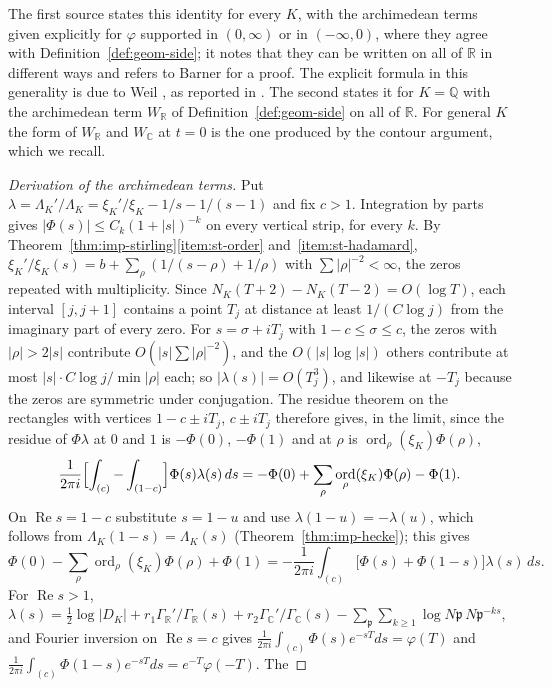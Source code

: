 \documentclass[11pt]{amsart}
\theoremstyle{plain}
\theoremstyle{definition}
\theoremstyle{remark}
\numberwithin{equation}{section}
\newcommand{\C}{\mathbb{C}}
\newcommand{\R}{\mathbb{R}}
\newcommand{\Q}{\mathbb{Q}}
\newcommand{\GR}{\Gamma_{\mathbb{R}}}
\newcommand{\GC}{\Gamma_{\mathbb{C}}}
\DeclareMathOperator{\Rea}{Re}
\DeclareMathOperator{\ord}{ord}
\renewcommand{\Re}{\Rea}
\begin{document}
The first source states this identity for every $K$, with the
archimedean terms given explicitly for $\varphi$ supported in
$(0,\infty)$ or in $(-\infty,0)$, where they agree with
Definition~\ref{def:geom-side}; it notes that they can be written on
all of $\R$ in different ways and refers to Barner
\cite{Barner1981Explicit} for a proof. The explicit formula in this
generality is due to Weil \cite{Weil1952Explicit}, as reported in
\cite[\S V, p.~8]{Bombieri2000Clay}. The
second states it for $K=\Q$ with the archimedean term $W_\R$ of
Definition~\ref{def:geom-side} on all of $\R$. For general $K$ the form
of $W_\R$ and $W_\C$ at $t=0$ is the one produced by the contour
argument, which we recall.

\begin{proof}[Derivation of the archimedean terms]
Put $\lambda=\Lambda_K'/\Lambda_K=\xi_K'/\xi_K-1/s-1/(s-1)$ and fix
$c>1$. Integration by parts gives $|\Phi(s)|\le C_k(1+|s|)^{-k}$ on
every vertical strip, for every $k$. By
Theorem~\ref{thm:imp-stirling}\ref{item:st-order}
and~\ref{item:st-hadamard},
$\xi_K'/\xi_K(s)=b+\sum_\rho(1/(s-\rho)+1/\rho)$ with
$\sum|\rho|^{-2}<\infty$, the zeros repeated with multiplicity. Since
$N_K(T+2)-N_K(T-2)=O(\log T)$, each interval $[j,j+1]$ contains a
point $T_j$ at distance at least $1/(C\log j)$ from the imaginary part
of every zero. For $s=\sigma+iT_j$ with $1-c\le\sigma\le c$, the zeros
with $|\rho|>2|s|$ contribute $O(|s|\sum|\rho|^{-2})$, and the
$O(|s|\log|s|)$ others contribute at most
$|s|\cdot C\log j/\min|\rho|$ each; so $|\lambda(s)|=O(T_j^3)$, and
likewise at $-T_j$ because the zeros are symmetric under conjugation.
The residue theorem on the rectangles with vertices $1-c\pm iT_j$,
$c\pm iT_j$ therefore gives, in the limit, since the residue of
$\Phi\lambda$ at $0$ and $1$ is $-\Phi(0)$, $-\Phi(1)$ and at $\rho$ is
$\ord_\rho(\xi_K)\Phi(\rho)$,
\[
\frac1{2\pi i}\Bigl[\int_{(c)}-\int_{(1-c)}\Bigr]\Phi(s)\lambda(s)\,ds
=-\Phi(0)+\sum_\rho\ord_\rho(\xi_K)\Phi(\rho)-\Phi(1).
\]
On $\Re s=1-c$ substitute $s=1-u$ and use $\lambda(1-u)=-\lambda(u)$,
which follows from $\Lambda_K(1-s)=\Lambda_K(s)$
(Theorem~\ref{thm:imp-hecke}); this gives
\[
\Phi(0)-\sum_\rho\ord_\rho(\xi_K)\Phi(\rho)+\Phi(1)
=-\frac1{2\pi i}\int_{(c)}\bigl[\Phi(s)+\Phi(1-s)\bigr]
\lambda(s)\,ds.
\]
For $\Re s>1$, $\lambda(s)=\tfrac12\log|D_K|+r_1\GR'/\GR(s)
+r_2\GC'/\GC(s)-\sum_{\mathfrak p}\sum_{k\ge1}\log N\mathfrak p\,
N\mathfrak p^{-ks}$, and Fourier inversion on $\Re s=c$ gives
$\frac1{2\pi i}\int_{(c)}\Phi(s)e^{-sT}ds=\varphi(T)$ and
$\frac1{2\pi i}\int_{(c)}\Phi(1-s)e^{-sT}ds=e^{-T}\varphi(-T)$. The

\end{proof}
\end{document}
